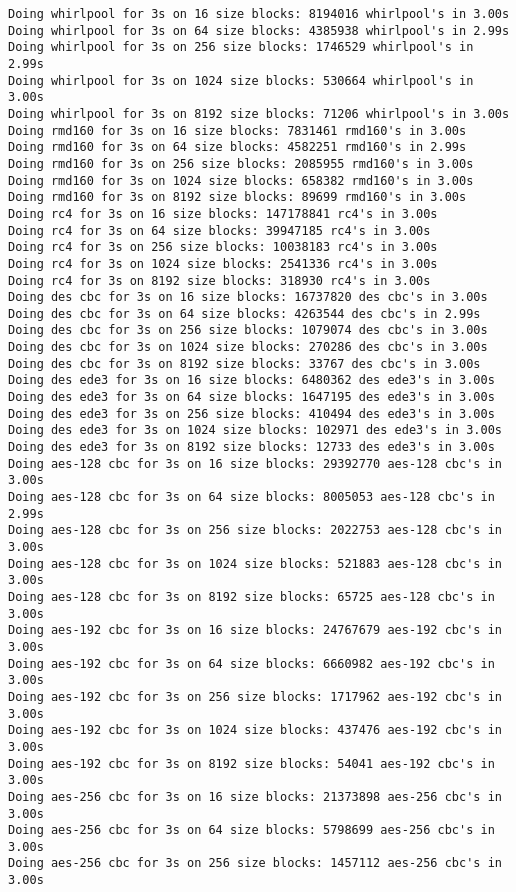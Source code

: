 \documentclass[%
 aip,
 jmp,%
 amsmath,amssymb,
 reprint,%
]{revtex4-1}
\begin{document}
\begin{verbatim}
Doing whirlpool for 3s on 16 size blocks: 8194016 whirlpool's in 3.00s
Doing whirlpool for 3s on 64 size blocks: 4385938 whirlpool's in 2.99s
Doing whirlpool for 3s on 256 size blocks: 1746529 whirlpool's in 2.99s
Doing whirlpool for 3s on 1024 size blocks: 530664 whirlpool's in 3.00s
Doing whirlpool for 3s on 8192 size blocks: 71206 whirlpool's in 3.00s
Doing rmd160 for 3s on 16 size blocks: 7831461 rmd160's in 3.00s
Doing rmd160 for 3s on 64 size blocks: 4582251 rmd160's in 2.99s
Doing rmd160 for 3s on 256 size blocks: 2085955 rmd160's in 3.00s
Doing rmd160 for 3s on 1024 size blocks: 658382 rmd160's in 3.00s
Doing rmd160 for 3s on 8192 size blocks: 89699 rmd160's in 3.00s
Doing rc4 for 3s on 16 size blocks: 147178841 rc4's in 3.00s
Doing rc4 for 3s on 64 size blocks: 39947185 rc4's in 3.00s
Doing rc4 for 3s on 256 size blocks: 10038183 rc4's in 3.00s
Doing rc4 for 3s on 1024 size blocks: 2541336 rc4's in 3.00s
Doing rc4 for 3s on 8192 size blocks: 318930 rc4's in 3.00s
Doing des cbc for 3s on 16 size blocks: 16737820 des cbc's in 3.00s
Doing des cbc for 3s on 64 size blocks: 4263544 des cbc's in 2.99s
Doing des cbc for 3s on 256 size blocks: 1079074 des cbc's in 3.00s
Doing des cbc for 3s on 1024 size blocks: 270286 des cbc's in 3.00s
Doing des cbc for 3s on 8192 size blocks: 33767 des cbc's in 3.00s
Doing des ede3 for 3s on 16 size blocks: 6480362 des ede3's in 3.00s
Doing des ede3 for 3s on 64 size blocks: 1647195 des ede3's in 3.00s
Doing des ede3 for 3s on 256 size blocks: 410494 des ede3's in 3.00s
Doing des ede3 for 3s on 1024 size blocks: 102971 des ede3's in 3.00s
Doing des ede3 for 3s on 8192 size blocks: 12733 des ede3's in 3.00s
Doing aes-128 cbc for 3s on 16 size blocks: 29392770 aes-128 cbc's in 3.00s
Doing aes-128 cbc for 3s on 64 size blocks: 8005053 aes-128 cbc's in 2.99s
Doing aes-128 cbc for 3s on 256 size blocks: 2022753 aes-128 cbc's in 3.00s
Doing aes-128 cbc for 3s on 1024 size blocks: 521883 aes-128 cbc's in 3.00s
Doing aes-128 cbc for 3s on 8192 size blocks: 65725 aes-128 cbc's in 3.00s
Doing aes-192 cbc for 3s on 16 size blocks: 24767679 aes-192 cbc's in 3.00s
Doing aes-192 cbc for 3s on 64 size blocks: 6660982 aes-192 cbc's in 3.00s
Doing aes-192 cbc for 3s on 256 size blocks: 1717962 aes-192 cbc's in 3.00s
Doing aes-192 cbc for 3s on 1024 size blocks: 437476 aes-192 cbc's in 3.00s
Doing aes-192 cbc for 3s on 8192 size blocks: 54041 aes-192 cbc's in 3.00s
Doing aes-256 cbc for 3s on 16 size blocks: 21373898 aes-256 cbc's in 3.00s
Doing aes-256 cbc for 3s on 64 size blocks: 5798699 aes-256 cbc's in 3.00s
Doing aes-256 cbc for 3s on 256 size blocks: 1457112 aes-256 cbc's in 3.00s

\end{verbatim}
\end{document}
